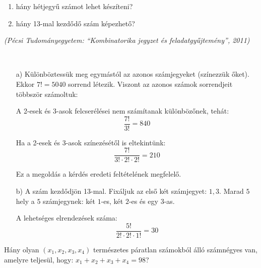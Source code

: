 \begin{enumerate}
\item hány hétjegyű számot lehet készíteni? 
\item hány 13-mal kezdődő szám képezhető? 
\end{enumerate}
\emph{(Pécsi Tudományegyetem: ``Kombinatorika jegyzet és feladatgyűjtemény'',
2011)}
\begin{solution}
~
\begin{itemize}
\item[a)] Különböztessük meg egymástól az azonos számjegyeket (színezzük őket).
Ekkor $7!=5040$ sorrend létezik. Viszont az azonos számok sorrendjeit
többször számoltuk:

A 2-esek és 3-asok felcserélései nem számítanak különbözőnek, tehát:
\[
\frac{7!}{3!}=840
\]

Ha a 2-esek és 3-asok színezésétől is eltekintünk: 
\[
\frac{7!}{3!\cdot2!\cdot2!}=210
\]

Ez a megoldás a kérdés eredeti feltételének megfelelő.
\item[b)] A szám kezdődjön 13-mal. Fixáljuk az első két számjegyet: $1,3$.
Marad $5$ hely a $5$ számjegynek: két $1$-es, két $2$-es és egy
$3$-as.

A lehetséges elrendezések száma: 
\[
\frac{5!}{2!\cdot2!\cdot1!}=30
\]

\end{itemize}
\end{solution}
\begin{extraproblem}
Hány olyan $(x_{1},x_{2},x_{3},x_{4})$ természetes páratlan számokból
álló számnégyes van, amelyre teljesül, hogy: $x_{1}+x_{2}+x_{3}+x_{4}=98$? 
\end{extraproblem}


